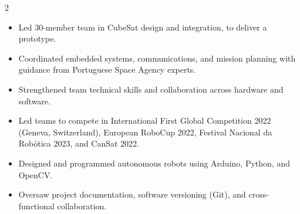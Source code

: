 \documentclass[10pt,a4paper,ragged2e,withhyper]{altacv}
\begin{document}
\begin{paracol}{2}
            \begin{itemize}
                \item Led 30-member team in CubeSat design and integration, to deliver a prototype.
                \item Coordinated embedded systems, communications, and mission planning with guidance from Portuguese Space Agency experts.
                \item Strengthened team technical skills and collaboration across hardware and software.
            \end{itemize}

            \begin{itemize}
                \item Led teams to compete in International First Global Competition 2022 (Geneva, Switzerland), European RoboCup 2022, Festival Nacional da Robótica 2023, and CanSat 2022.
                \item Designed and programmed autonomous robots using Arduino, Python, and OpenCV.
                \item Oversaw project documentation, software versioning (Git), and cross-functional collaboration.
            \end{itemize}

        
        

            
        
        
    \end{paracol}
\end{document}
